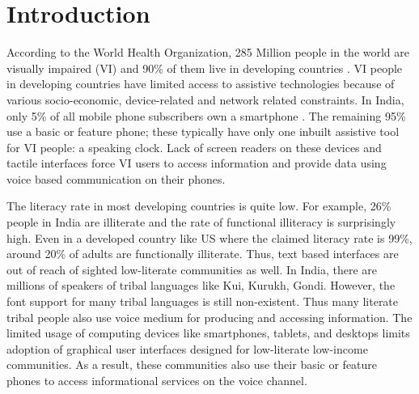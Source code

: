 \documentclass{sigchi}
\begin{document}
\section{Introduction}
According to the World Health Organization, 285 Million people in the world are visually impaired (VI) and 90\% of them live in developing countries \cite{WHO2013}. VI people in developing countries have limited access to assistive technologies because of various socio-economic, device-related and network related constraints. In India, only
5\% of all mobile phone subscribers own a smartphone \cite{Mary2013}. The remaining 95\% use a basic or feature phone; these typically have only one inbuilt assistive tool for VI people: a speaking clock. Lack of screen readers on these devices and tactile interfaces force VI users to access information and provide data using voice based communication on their phones. 

The literacy rate in most developing countries is quite low. For example, 26\% people in India are illiterate and the rate of functional illiteracy is surprisingly high. Even in a developed country like US where the claimed literacy rate is 99\%, around 20\% of adults are functionally illiterate. Thus, text based interfaces are out of reach of sighted low-literate communities as well. In India, there are millions of speakers of tribal languages like Kui, Kurukh, Gondi. However, the font support for many tribal languages is still non-existent. Thus many literate tribal people also use voice medium for producing and accessing information. The limited usage of computing devices like smartphones, tablets, and desktops limits adoption of graphical user interfaces designed for low-literate low-income communities. As a result, these communities also use their basic or feature phones to access informational services on the voice channel.
\end{document}
